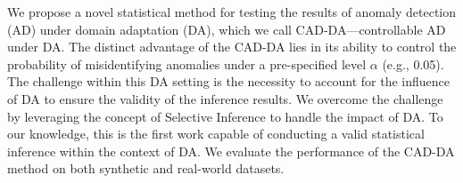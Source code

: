 
We propose a novel statistical method for testing the results of anomaly detection (AD) under domain adaptation (DA), which we call CAD-DA---controllable AD under DA. The distinct advantage of the CAD-DA lies in its ability to control the probability of misidentifying anomalies under a pre-specified level $\alpha$ (e.g., 0.05). The challenge within this DA setting is the necessity to account for the influence of DA to ensure the validity of the inference results. We overcome the challenge by leveraging the concept of Selective Inference to handle the impact of DA. To our knowledge, this is the first work capable of conducting a valid statistical inference within the context of DA. We evaluate the performance of the CAD-DA method on both synthetic and real-world datasets.





